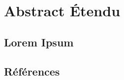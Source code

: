 \chapter{Abstract Étendu}
\label{chap:abstract}

\lipsum[1-2]

\section{Lorem Ipsum}
\lipsum[3-4]

\section{Références}
\printbibliography[type=book,heading=none]
\printbibliography[type=online,heading=none]